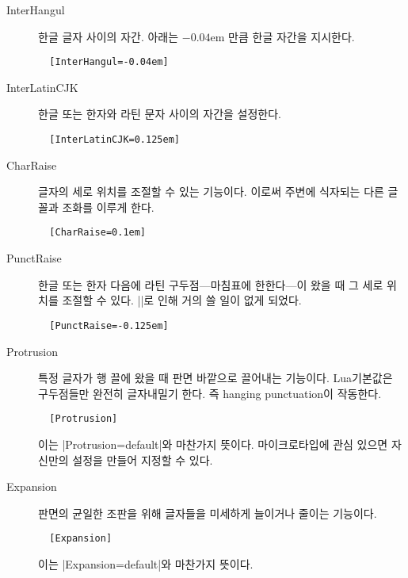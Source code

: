 \documentclass[a4paper]{article}
\begin{document}
\begin{description}
\item[InterHangul] 한글 글자 사이의 자간.  아래는 $-0.04$em 만큼 한글
  자간을 지시한다.
\begin{verbatim}
  [InterHangul=-0.04em]
\end{verbatim}

\item[InterLatinCJK] 한글 또는 한자와 라틴 문자 사이의 자간을
  설정한다.
\begin{verbatim}
  [InterLatinCJK=0.125em]
\end{verbatim}

\item[CharRaise] 글자의 세로 위치를
  { 조절}할 수 있는 기능이다.
  이로써 주변에 식자되는 다른 글꼴과 조화를 이루게 한다.
\begin{verbatim}
  [CharRaise=0.1em]
\end{verbatim}

\item[PunctRaise] 한글 또는 한자 다음에 라틴 구두점---마침표에
  한한다---이 왔을 때 그 세로 위치를 조절할 수 있다.
  |\hangulpunctuations|로 인해 거의 쓸 일이 없게 되었다.
\begin{verbatim}
  [PunctRaise=-0.125em]
\end{verbatim}

\item[Protrusion] 특정 글자가 행 끌에 왔을 때 판면 바깥으로 끌어내는
  기능이다.  Lua 기본값은 구두점들만 완전히 글자내밀기 한다. 즉
  hanging punctuation이 작동한다.
\begin{verbatim}
  [Protrusion]
\end{verbatim}
  이는 |Protrusion=default|와 마찬가지 뜻이다.  마이크로타입에 관심
  있으면 자신만의 설정을 만들어 지정할 수 있다.

\item[Expansion] 판면의 균일한 조판을 위해 글자들을 미세하게 늘이거나
  줄이는 기능이다.
\begin{verbatim}
  [Expansion]
\end{verbatim}
  이는 |Expansion=default|와 마찬가지 뜻이다.

\end{description}
\end{document}
